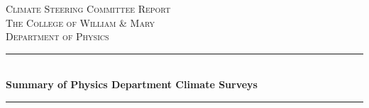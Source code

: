 \documentclass[oneside]{book}   %
\begin{document}
 
\frontmatter

\begin{titlepage} %
	\newcommand{\HRule}{\rule{\linewidth}{0.5mm}} %
	
	\center %
	
	
	\textsc{\LARGE Climate Steering Committee Report}\\[1.5cm] %
	
	\textsc{\Large The College of William \& Mary}\\[0.5cm] %
	
	\textsc{\large Department of Physics}\\[0.5cm] %
	
	
	\HRule\\[0.4cm]
	
	{\huge\bfseries Summary of Physics Department Climate Surveys}\\[0.4cm] %
	
	\HRule\\[1.5cm]
	
	

\end{titlepage}
\end{document}
